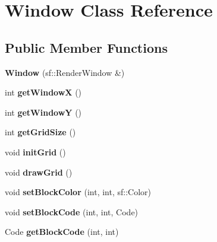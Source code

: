 \hypertarget{class_window}{\section{Window Class Reference}
\label{class_window}
}
\subsection*{Public Member Functions}
\begin{DoxyCompactItemize}
\item 
\hypertarget{class_window_ae7fcb005520e3739c5642d62cc8ce373}{{\bfseries Window} (sf\+::\+Render\+Window \&)}\label{class_window_ae7fcb005520e3739c5642d62cc8ce373}

\item 
\hypertarget{class_window_a236271e16d54b937a863c92108ca8424}{int {\bfseries get\+Window\+X} ()}\label{class_window_a236271e16d54b937a863c92108ca8424}

\item 
\hypertarget{class_window_a8b9bfe859b6923e31af7404ae39186c2}{int {\bfseries get\+Window\+Y} ()}\label{class_window_a8b9bfe859b6923e31af7404ae39186c2}

\item 
\hypertarget{class_window_a2da7eb6f9b4b2c1ceb6f5649123b0114}{int {\bfseries get\+Grid\+Size} ()}\label{class_window_a2da7eb6f9b4b2c1ceb6f5649123b0114}

\item 
\hypertarget{class_window_a2d28a49da612da02a5aed7592dcd41e5}{void {\bfseries init\+Grid} ()}\label{class_window_a2d28a49da612da02a5aed7592dcd41e5}

\item 
\hypertarget{class_window_a21a906e30fbf996127248c1bb891715d}{void {\bfseries draw\+Grid} ()}\label{class_window_a21a906e30fbf996127248c1bb891715d}

\item 
\hypertarget{class_window_accf239fc00014280c44846b21b1d046a}{void {\bfseries set\+Block\+Color} (int, int, sf\+::\+Color)}\label{class_window_accf239fc00014280c44846b21b1d046a}

\item 
\hypertarget{class_window_aa3edea918875db7c504cb3e321af91b7}{void {\bfseries set\+Block\+Code} (int, int, Code)}\label{class_window_aa3edea918875db7c504cb3e321af91b7}

\item 
\hypertarget{class_window_ab53c6562095ae1453dbe7d1f615ec0a6}{Code {\bfseries get\+Block\+Code} (int, int)}\label{class_window_ab53c6562095ae1453dbe7d1f615ec0a6}


\end{DoxyCompactItemize}
